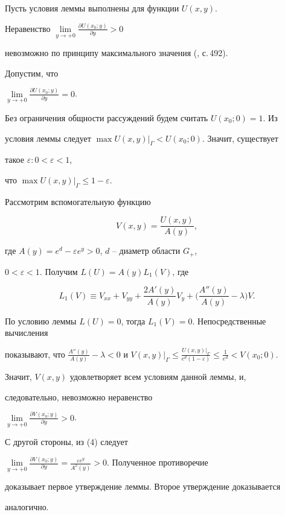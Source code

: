 \begin{pf} 


Пусть условия леммы выполнены для функции $U(x,y)$. 


 


Неравенство $\lim\limits_{y\to+0}\frac{\partial U(x_0;y)}{\partial y}>0$ 


невозможно по принципу максимального значения (\cite{1}, с.\,492). 


Допустим, что 


$\lim\limits_{y\to+0}\frac{\partial U(x_0;y)}{\partial y}{=}0$. 


Без ограничения общности рассуждений будем считать $U(x_0;0){=}1$. Из 


условия леммы следует $\max U(x,y)|_\Gamma<U(x_0;0)$. Значит, существует 


такое $\varepsilon:0<\varepsilon<1$,


что $\max U(x,y)|_\Gamma\le1-\varepsilon$. 


 


Рассмотрим вспомогательную функцию 


\begin{equation} 


V(x,y)=\frac{U(x,y)}{A(y)}, 


\end{equation} 


где $A(y)=e^d-\varepsilon e^y>0$, $d$ -- диаметр области $G_+$, 


$0<\varepsilon<1$. Получим $L(U)=A(y) L_1(V)$, где 


$$ 


L_1(V)\equiv V_{xx}+V_{yy}+\frac{2 A'(y)}{A(y)} V_y+ 


\bigg(\frac{A''(y)}{A(y)}-\lambda \bigg) V. 


$$ 


 


По условию леммы $L(U)=0$, тогда $L_1(V)=0$. Непосредственные вычисления 


показывают, что $\frac{A''(y)}{A(y)}-\lambda<0$ и $V(x,y)|_\Gamma\le 


\frac{U(x,y)|_\Gamma}{e^d(1-\varepsilon)}\le \frac{1}{e^d}< V(x_0;0)$. 


Значит, $V(x,y)$ удовлетворяет всем условиям данной леммы, и, 


следовательно, невозможно неравенство


$\lim\limits_{y\to+0}\frac{\partial V(x_0;y)}{\partial y}>0$. 


С другой стороны, из (4) следует 


$\lim\limits_{y\to+0}\frac{\partial V(x_0;y)}{\partial y}= 


\frac{\varepsilon e^y}{A^2(y)}>0$. Полученное противоречие 


доказывает первое утверждение леммы. Второе утверждение доказывается 


аналогично. 


\end{pf} 


